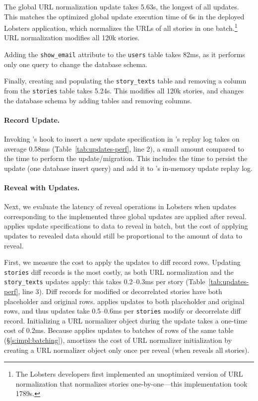 %
The global URL normalization update takes 5.63s, the longest of all
updates.
%
This matches the optimized global update execution time of 6s in the deployed
Lobsters application, which normalizes the URLs of all stories in one
batch.\footnote{The Lobsters developers first implemented an unoptimized version
of URL normalization that normalizes stories one-by-one---this implementation
took 1789s.}
%
URL normalization modifies all 120k stories.
%

%
Adding the \texttt{show\_email} attribute to the \texttt{users} table takes
82ms, as it performs only one query to change the database schema.
%

%
Finally, creating and populating the \texttt{story\_texts} table and removing a
column from the \texttt{stories} table takes 5.24s.
%
This modifies all 120k stories, and changes the database schema by adding tables
and removing columns.
%

%
\paragraph{Record Update.}
%
Invoking \sys's hook to insert a new update specification in \sys's replay log
takes on average 0.58ms (Table~\ref{tab:updates-perf}, line 2), a small 
amount compared to the time to perform the update/migration. This includes the
time to persist the update (one database insert query) and add it to \sys's
in-memory update replay log.
%

%
\paragraph{Reveal with Updates.}
%
Next, we evaluate the latency of reveal operations in Lobsters when updates
corresponding to the implemented three global updates are applied after
reveal. \sys applies update specifications to data to reveal in batch, but the cost of
applying updates to revealed data should still be proportional to the amount of
data to reveal.

First, we measure the cost to apply the updates to diff record rows.
%
Updating \texttt{stories} diff records is the most costly, as both URL
normalization and the \texttt{story\_texts} updates apply: this takes 0.2--0.3ms
per story (Table~\ref{tab:updates-perf}, line 3).
%
Diff records for modified or decorrelated stories have both placeholder and
original rows. \sys applies updates to both placeholder and original rows, and
thus updates take 0.5--0.6ms per \texttt{stories} modify or decorrelate diff
record.
%
Initializing a URL normalizer object during the update takes a one-time cost of
0.2ms.
%
Because \sys applies updates to batches of rows of the same table
(\S\ref{s:impl:batching}), \sys amortizes the cost of URL normalizer
initialization by creating a URL normalizer object only once per reveal (when
\sys reveals all stories).
%

